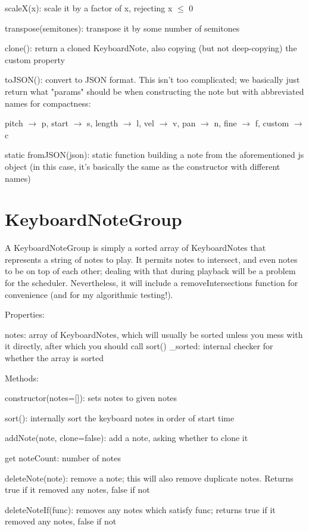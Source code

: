 \documentclass{article}
\begin{document}
scaleX(x): scale it by a factor of x, rejecting x $\leq$ 0

transpose(semitones): transpose it by some number of semitones

clone(): return a cloned KeyboardNote, also copying (but not deep-copying) the custom property

toJSON(): convert to JSON format. This isn't too complicated; we basically just return what "params" should be when constructing the note but with abbreviated names for compactness:

pitch $\rightarrow$ p, start $\rightarrow$ s, length $\rightarrow$ l, vel $\rightarrow$ v, pan $\rightarrow$ n, fine $\rightarrow$ f, custom $\rightarrow$ c

static fromJSON(json): static function building a note from the aforementioned js object (in this case, it's basically the same as the constructor with different names)

\section{KeyboardNoteGroup}

A KeyboardNoteGroup is simply a sorted array of KeyboardNotes that represents a string of notes to play. It permits notes to intersect, and even notes to be on top of each other; dealing with that during playback will be a problem for the scheduler. Nevertheless, it will include a removeIntersections function for convenience (and for my algorithmic testing!).

Properties:

notes: array of KeyboardNotes, which will usually be sorted unless you mess with it directly, after which you should call sort()
\_sorted: internal checker for whether the array is sorted

Methods:

constructor(notes=[]): sets notes to given notes

sort(): internally sort the keyboard notes in order of start time

addNote(note, clone=false): add a note, asking whether to clone it

get noteCount: number of notes

deleteNote(note): remove a note; this will also remove duplicate notes. Returns true if it removed any notes, false if not

deleteNoteIf(func): removes any notes which satisfy func; returns true if it removed any notes, false if not
\end{document}

